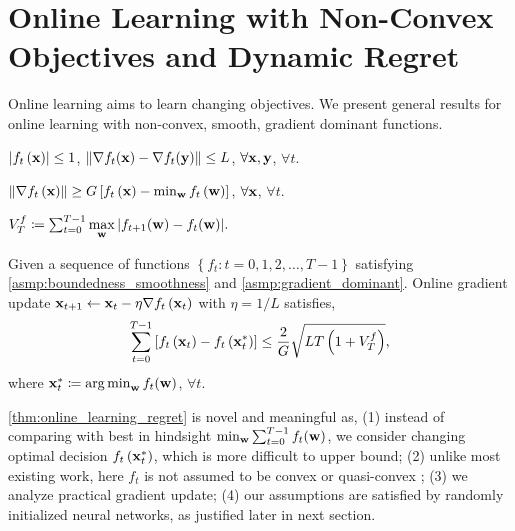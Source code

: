 \section{Online Learning with Non-Convex Objectives and Dynamic Regret}

Online learning aims to learn changing objectives. We present general results for online learning with non-convex, smooth, gradient dominant functions.

\begin{asmp}
\label{asmp:boundedness_smoothness}
$\left| f_t\left({\mathbf{x}}\right) \right| \le 1$, $\left\| \nabla f_t({\mathbf{x}} ) - \nabla f_t({\mathbf{y}}) \right\| \le L $, $\forall {\mathbf{x}}, {\mathbf{y}}$, $\forall t$.
\end{asmp}

\begin{asmp}
\label{asmp:gradient_dominant}
$\left\| \nabla f_t\left({\mathbf{x}}\right) \right\| \ge G \left[ f_t\left({\mathbf{x}}\right) - \min_{{\mathbf{w}}}{ f_t\left({\mathbf{w}} \right)} \right]$, $\forall {\mathbf{x}}$, $\forall t$.
\end{asmp}

\begin{defi}
\label{defi:function_variation}
$V_{T}^{f} \coloneqq \sum_{t=0}^{T-1}{\max\limits_{{\mathbf{w}}}{\left| f_{t+1}({\mathbf{w}}) - f_{t}({\mathbf{w}}) \right| } }.$
\end{defi}

\begin{thm}
\label{thm:online_learning_regret}
Given a sequence of functions $\left\{ f_t : t = 0, 1, 2, \dots, T-1 \right\}$ satisfying \cref{asmp:boundedness_smoothness} and \cref{asmp:gradient_dominant}. Online gradient update ${\mathbf{x}}_{t+1} \gets {\mathbf{x}}_{t} - \eta \nabla f_{t}\left({\mathbf{x}}_{t}\right)$ with $\eta = 1/L$ satisfies,
\begin{equation}
\label{eq:online_learning_regret}
\begin{split}
    \sum\limits_{t=0}^{T-1}{\left[ f_t\left({\mathbf{x}}_t\right) - f_t\left( {\mathbf{x}}_t^* \right) \right]} \le \frac{2}{G} \sqrt{L T \left( 1 + V_T^f \right)},
\end{split}
\end{equation}
where ${\mathbf{x}}_t^* \coloneqq \operatorname*{arg\,min}_{{\mathbf{w}}}{f_t({\mathbf{w}})}$, $\forall t$.
\end{thm}

\cref{thm:online_learning_regret} is novel and meaningful as, (1) instead of comparing with best in hindsight $\min_{{\mathbf{w}}}{\sum_{t=0}^{T-1}{f_t({\mathbf{w}})} }$, we consider changing optimal decision $f_t\left( {\mathbf{x}}_t^* \right)$, which is more difficult to upper bound; (2) unlike most existing work, here $f_t$ is not assumed to be convex \citep{yang2016tracking} or quasi-convex \citep{gao2018online}; (3) we analyze practical gradient update; (4) our assumptions are  satisfied by randomly initialized neural networks, as justified later in next section.

